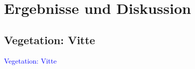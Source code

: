 \documentclass[xcolor=dvipsnames]{beamer}
\begin{document}


\section{Ergebnisse und Diskussion}
\subsection{Vegetation: Vitte}

\begin{frame}
\center
\textcolor{Blue}{{\LARGE Vegetation: Vitte}}
\end{frame}
\end{document}

